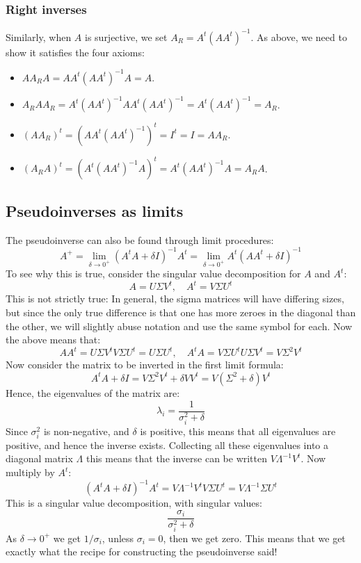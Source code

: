 \documentclass[12pt, a4paper]{article}
\numberwithin{equation}{section}
\begin{document}
\subsubsection{Right inverses}
Similarly, when $A$ is surjective, we set $A_R=A^t(AA^t)^{-1}$. As above, we need to show it satisfies the four axioms:
\begin{itemize}
\item $AA_R A=AA^t(AA^t)^{-1}A=A$.
\item $A_R AA_R=A^t(AA^t)^{-1}AA^t(AA^t)^{-1}=A^t(AA^t)^{-1}=A_R$.
\item $(AA_R)^t=(AA^t(AA^t)^{-1})^t=I^t=I=AA_R$.
\item $(A_R A)^t=(A^t(AA^t)^{-1}A)^t=A^t(AA^t)^{-1}A=A_R A$.
\end{itemize}

\subsection{Pseudoinverses as limits}
The pseudoinverse can also be found through limit procedures:
\begin{equation}
A^+=\lim_{\delta\rightarrow 0^+}(A^t A+\delta I)^{-1}A^t=\lim_{\delta\rightarrow 0^+}A^t(AA^t+\delta I)^{-1}
\end{equation}
To see why this is true, consider the singular value decomposition for $A$ and $A^t$:
\begin{equation}
A=U\Sigma V^t,\quad A^t=V\Sigma U^t
\end{equation}
This is not strictly true: In general, the sigma matrices will have differing sizes, but since the only true difference is that one has more zeroes in the diagonal than the other, we will slightly abuse notation and use the same symbol for each. Now the above means that:
\begin{equation}
AA^t=U\Sigma V^t V\Sigma U^t=U\Sigma U^t,\quad
A^t A=V\Sigma U^t U\Sigma V^t=V\Sigma^2 V^t
\end{equation}
Now consider the matrix to be inverted in the first limit formula:
\begin{equation}
A^t A+\delta I=V\Sigma^2 V^t+\delta VV^t=V(\Sigma^2+\delta)V^t
\end{equation}
Hence, the eigenvalues of the matrix are:
\begin{equation}
\lambda_i=\frac{1}{\sigma_i^2+\delta}
\end{equation}
Since $\sigma_i^2$ is non-negative, and $\delta$ is positive, this means that all eigenvalues are positive, and hence the inverse exists. Collecting all these eigenvalues into a diagonal matrix $\Lambda$ this means that the inverse can be written $V\Lambda^{-1}V^t$. Now multiply by $A^t$:
\begin{equation}
(A^t A+\delta I)^{-1}A^t=V\Lambda^{-1}V^t V\Sigma U^t=V\Lambda^{-1}\Sigma U^t
\end{equation}
This is a singular value decomposition, with singular values:
\begin{equation}
\frac{\sigma_i}{\sigma_i^2+\delta}
\end{equation}
As $\delta\rightarrow 0^+$ we get $1/\sigma_i$, unless $\sigma_i=0$, then we get zero. This means that we get exactly what the recipe for constructing the pseudoinverse said!
\end{document}
